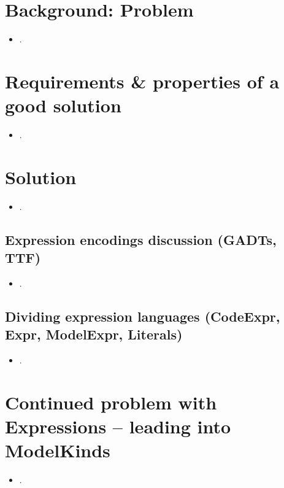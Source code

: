\section{Background: Problem}

\begin{itemize}
    
    \item .

\end{itemize}


\section{Requirements \& properties of a good solution}

\begin{itemize}
    
    \item .

\end{itemize}

\section{Solution}

\begin{itemize}
    
    \item .

\end{itemize}

\subsection{Expression encodings discussion (GADTs, TTF)}

\begin{itemize}
    
    \item .

\end{itemize}

\subsection{Dividing expression languages (CodeExpr, Expr, ModelExpr, Literals)}

\begin{itemize}
    
    \item .

\end{itemize}

\section{Continued problem with Expressions -- leading into ModelKinds}

\begin{itemize}
    
    \item .

\end{itemize}
